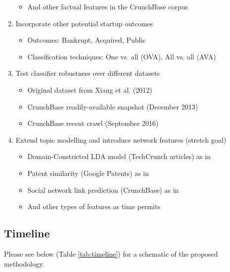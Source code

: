 \documentclass[12pt, a4paper]{article}
\begin{document}
\begin{enumerate}
\begin{itemize}
\item   And other factual features in the CrunchBase corpus
\end{itemize}
\item Incorporate other potential startup outcomes
\begin{itemize}
\item   Outcomes: Bankrupt, Acquired, Public
\item   Classification techniques: One vs. all (OVA), All vs. all (AVA)
\end{itemize}
\item Test classifier robustness over different datasets
\begin{itemize}
\item Original dataset from Xiang et al. (2012) \cite{xiang2012}
\item CrunchBase readily-available snapshot (December 2013)
\item CrunchBase recent crawl (September 2016)
\end{itemize}
\item Extend topic modelling and introduce network features (stretch goal)
\begin{itemize}
\item   Domain-Constricted LDA model (TechCrunch articles) as in \cite{yuan2016}
\item   Patent similarity (Google Patents) as in \cite{huang2015}
\item   Social network link prediction (CrunchBase) as in \cite{shi2014,yuxian2013}
\item   And other types of features as time permits
\end{itemize}
\end{enumerate}

\subsection*{Timeline}

Please see below (Table \ref{tab:timeline}) for a schematic of the proposed methodology.
\end{document}
